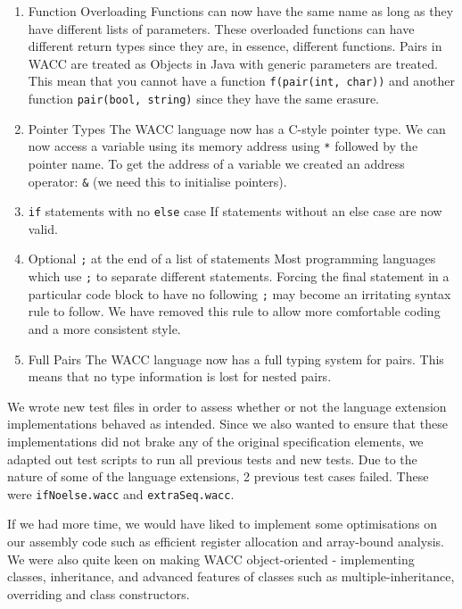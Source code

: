 \documentclass[11pt,a4paper]{article}
\begin{document}
\begin{enumerate}
	\item Function Overloading\newline
	Functions can now have the same name as long as they have different lists of parameters. These overloaded functions can have different return types since they are, in essence, different functions. Pairs in WACC are treated as Objects in Java with generic parameters are treated. This mean that you cannot have a function \texttt{f(pair(int, char))} and another function \texttt{pair(bool, string)} since they have the same erasure.
	
	\item Pointer Types\newline
	The WACC language now has a C-style pointer type. We can now access a variable using its memory address using \texttt{*} followed by the pointer name. To get the address of a variable we created an address operator: \texttt{\&} (we need this to initialise pointers).
	
	\item \texttt{if} statements with no \texttt{else} case\newline
	If statements without an else case are now valid.
	
	\item Optional \texttt{;} at the end of a list of statements
	Most programming languages which use \texttt{;} to separate different statements. Forcing the final statement in a particular code block to have no following \texttt{;} may become an irritating syntax rule to follow. We have removed this rule to allow more comfortable coding and a more consistent style.
	
	\item Full Pairs\newline
	The WACC language now has a full typing system for pairs. This means that no type information is lost for nested pairs. 
	
\end{enumerate}

We wrote new test files in order to assess whether or not the language extension implementations behaved as intended. Since we also wanted to ensure that these implementations did not brake any of the original specification elements, we adapted out test scripts to run all previous tests and new tests. Due to the nature of some of the language extensions, 2 previous test cases failed. These were \texttt{ifNoelse.wacc} and \texttt{extraSeq.wacc}.

If we had more time, we would have liked to implement some optimisations on our assembly code such as efficient register allocation and array-bound analysis. We were also quite keen on making WACC object-oriented - implementing classes, inheritance, and advanced features of classes such as multiple-inheritance, overriding and class constructors.
\end{document}
